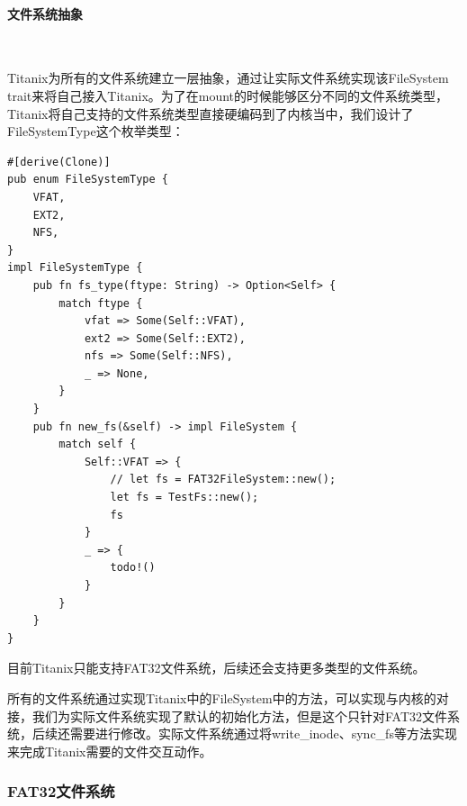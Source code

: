 \paragraph{文件系统抽象}~{}

Titanix为所有的文件系统建立一层抽象，通过让实际文件系统实现该FileSystem trait来将自己接入Titanix。为了在mount的时候能够区分不同的文件系统类型，Titanix将自己支持的文件系统类型直接硬编码到了内核当中，我们设计了FileSystemType这个枚举类型：
\begin{tcolorbox}[
title=\textbf{os/src/fs/file\_system.rs},
listing only,
breakable
]
\begin{verbatim}
#[derive(Clone)]
pub enum FileSystemType {
    VFAT,
    EXT2,
    NFS,
}
impl FileSystemType {
    pub fn fs_type(ftype: String) -> Option<Self> {
        match ftype {
            vfat => Some(Self::VFAT),
            ext2 => Some(Self::EXT2),
            nfs => Some(Self::NFS),
            _ => None,
        }
    }
    pub fn new_fs(&self) -> impl FileSystem {
        match self {
            Self::VFAT => {
                // let fs = FAT32FileSystem::new();
                let fs = TestFs::new();
                fs
            }
            _ => {
                todo!()
            }
        }
    }
}
\end{verbatim}
\end{tcolorbox}
目前Titanix只能支持FAT32文件系统，后续还会支持更多类型的文件系统。

所有的文件系统通过实现Titanix中的FileSystem中的方法，可以实现与内核的对接，我们为实际文件系统实现了默认的初始化方法，但是这个只针对FAT32文件系统，后续还需要进行修改。实际文件系统通过将write\_inode、sync\_fs等方法实现来完成Titanix需要的文件交互动作。

\subsubsection{FAT32文件系统}